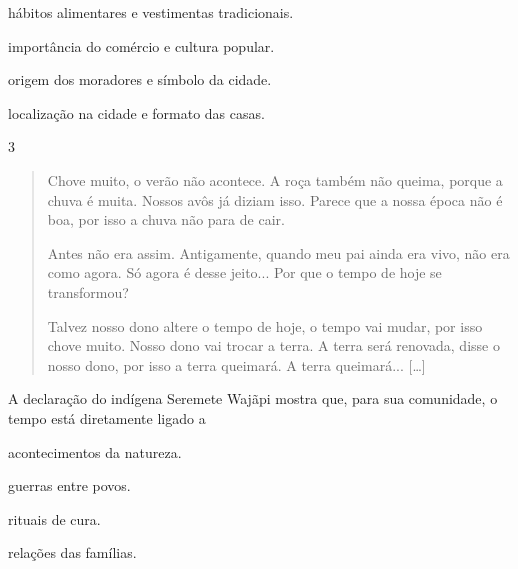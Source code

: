 \begin{escolha}
\item hábitos alimentares e vestimentas tradicionais.

\item importância do comércio e cultura popular.

\item origem dos moradores e símbolo da cidade.

\item localização na cidade e formato das casas.
\end{escolha}


\num{3}

\begin{quote}
Chove muito, o verão não acontece. A roça também não queima, porque a
chuva é muita. Nossos avôs já diziam isso. Parece que a nossa época não
é boa, por isso a chuva não para de cair.

Antes não era assim. Antigamente, quando meu pai ainda era vivo, não era
como agora. Só agora é desse jeito... Por que o tempo de hoje se
transformou?

Talvez nosso dono altere o tempo de hoje, o tempo vai mudar, por isso
chove muito. Nosso dono vai trocar a terra. A terra será renovada, disse
o nosso dono, por isso a terra queimará. A terra queimará... {[}\ldots{}{]}

\end{quote}

A declaração do indígena Seremete Wajãpi mostra que, para sua comunidade, o tempo está diretamente ligado a

\begin{minipage}{.5\textwidth}
\begin{escolha}
\item acontecimentos da natureza.

\item guerras entre povos.

\item rituais de cura.

\item relações das famílias.
\end{escolha}
\end{minipage}

